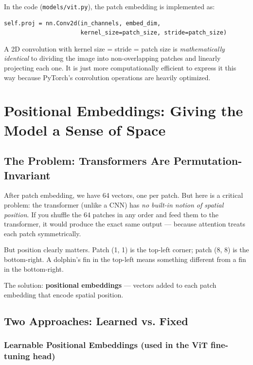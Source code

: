 \documentclass[12pt, a4paper]{report}
\begin{document}
In the code (\texttt{models/vit.py}), the patch embedding is implemented as:

\begin{lstlisting}[caption=Patch Embedding in PyTorch]
self.proj = nn.Conv2d(in_channels, embed_dim,
                      kernel_size=patch_size, stride=patch_size)
\end{lstlisting}

A 2D convolution with kernel size = stride = patch size is \emph{mathematically identical} to dividing the image into non-overlapping patches and linearly projecting each one. It is just more computationally efficient to express it this way because PyTorch's convolution operations are heavily optimized.

\chapter{Positional Embeddings: Giving the Model a Sense of Space}

\section{The Problem: Transformers Are Permutation-Invariant}

After patch embedding, we have 64 vectors, one per patch. But here is a critical problem: the transformer (unlike a CNN) has \emph{no built-in notion of spatial position}. If you shuffle the 64 patches in any order and feed them to the transformer, it would produce the exact same output — because attention treats each patch symmetrically.

But position clearly matters. Patch (1, 1) is the top-left corner; patch (8, 8) is the bottom-right. A dolphin's fin in the top-left means something different from a fin in the bottom-right.

The solution: \textbf{positional embeddings} — vectors added to each patch embedding that encode spatial position.

\section{Two Approaches: Learned vs. Fixed}

\subsection{Learnable Positional Embeddings (used in the ViT fine-tuning head)}
\end{document}
